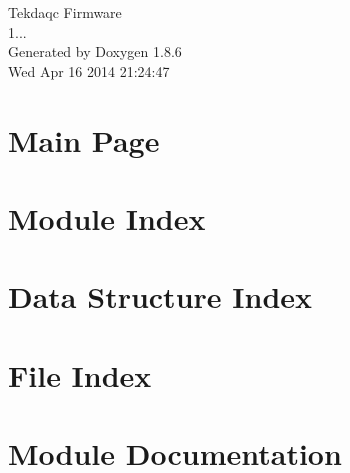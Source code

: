 \documentclass[twoside]{book}
\newcommand{\clearemptydoublepage}{%
  \newpage{\pagestyle{empty}\cleardoublepage}%
}
\begin{document}
\hypersetup{pageanchor=false}
\begin{titlepage}
\vspace*{7cm}
\begin{center}%
{\Large Tekdaqc Firmware \\[1ex]\large 1... }\\
\vspace*{1cm}
{\large Generated by Doxygen 1.8.6}\\
\vspace*{0.5cm}
{\small Wed Apr 16 2014 21:24:47}\\
\end{center}
\end{titlepage}
\clearemptydoublepage
\tableofcontents
\clearemptydoublepage
{}
\hypersetup{pageanchor=true}

\chapter{Main Page}
\label{index}\hypertarget{index}{}
\chapter{Module Index}

\chapter{Data Structure Index}

\chapter{File Index}

\chapter{Module Documentation}





































\end{document}
